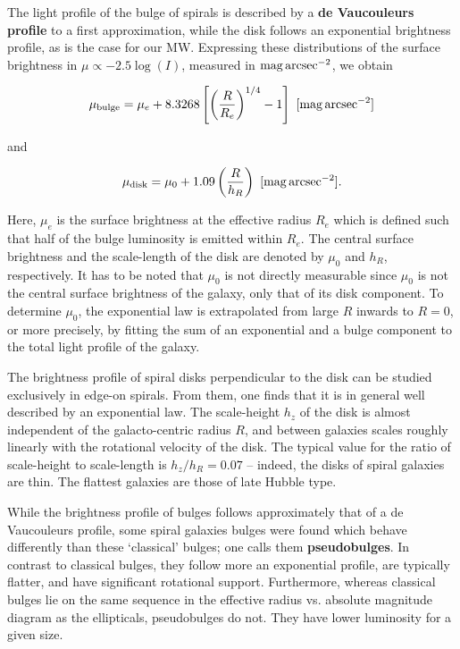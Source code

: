 \documentclass[a4paper,10pt]{article}
\begin{document}
{\noindent}The light profile of the bulge of spirals is described by a \textbf{de Vaucouleurs profile} to a first approximation, while the disk follows an exponential brightness profile, as is the case for our MW. Expressing these distributions of the surface brightness in $\mu\propto-2.5\log(I)$, measured in ${\rm mag\,arcsec^{-2}}$, we obtain

\begin{align*}
    \mu_\mathrm{bulge} = \mu_e + 8.3268\left[\left(\frac{R}{R_e}\right)^{1/4}-1\right] ~ [{\rm mag\,arcsec^{-2}}]
\end{align*}

{\noindent}and

\begin{align*}
    \mu_\mathrm{disk} = \mu_0 + 1.09\left(\frac{R}{h_R}\right) ~ [{\rm mag\,arcsec^{-2}}].
\end{align*}

{\noindent}Here, $\mu_e$ is the surface brightness at the effective radius $R_e$ which is defined such that half of the bulge luminosity is emitted within $R_e$. The central surface brightness and the scale-length of the disk are denoted by $\mu_0$ and $h_R$, respectively. It has to be noted that $\mu_0$ is not directly measurable since $\mu_0$ is not the central surface brightness of the galaxy, only that of its disk component. To determine $\mu_0$, the exponential law is extrapolated from large $R$ inwards to $R=0$, or more precisely, by fitting the sum of an exponential and a bulge component to the total light profile of the galaxy.

{\noindent}The brightness profile of spiral disks perpendicular to the disk can be studied exclusively in edge-on spirals. From them, one finds that it is in general well described by an exponential law. The scale-height $h_z$ of the disk is almost independent of the galacto-centric radius $R$, and between galaxies scales roughly linearly with the rotational velocity of the disk. The typical value for the ratio of scale-height to scale-length is $h_z/h_R=0.07$ -- indeed, the disks of spiral galaxies are thin. The flattest galaxies are those of late Hubble type.

{\noindent}While the brightness profile of bulges follows approximately that of a de Vaucouleurs profile, some spiral galaxies bulges were found which behave differently than these `classical' bulges; one calls them \textbf{pseudobulges}. In contrast to classical bulges, they follow more an exponential profile, are typically flatter, and have significant rotational support. Furthermore, whereas classical bulges lie on the same sequence in the effective radius vs. absolute magnitude diagram as the ellipticals, pseudobulges do not. They have lower luminosity for a given size.
\end{document}
